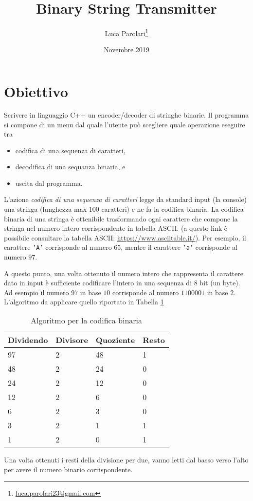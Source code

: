 \documentclass[11pt,a4paper]{article}
\author{
	Luca Parolari\thanks{\href{mailto:luca.parolari23@gmail.com}{luca.parolari23@gmail.com}}}
\title{Binary String Transmitter}
\date{Novembre 2019}
\begin{document}
	
	\maketitle
	
	\section{Obiettivo}
	
	Scrivere in linguaggio C++ un encoder/decoder di stringhe binarie. Il programma si compone di un menu dal quale l'utente può scegliere quale operazione eseguire tra
	\begin{itemize}
		\item codifica di una sequenza di caratteri,
		\item decodifica di una sequanza binaria, e
		\item uscita dal programma.
	\end{itemize}
	
	L'azione \textit{codifica di una sequenza di caratteri} legge da standard input (la console) una stringa (lunghezza max 100 caratteri) e ne fa la codifica binaria. La codifica binaria di una stringa è ottenibile trasformando ogni carattere che compone la stringa nel numero intero corrispondente in tabella ASCII. (a questo link è possibile consultare la tabella ASCII: \href{https://www.asciitable.it/}{https://www.asciitable.it/}). Per esempio, il carattere \texttt{'A'} corrisponde al numero $65$, mentre il carattere \texttt{'a'} corrisponde al numero $97$. 
	
	A questo punto, una volta ottenuto il numero intero che rappresenta il carattere dato in input è sufficiente codificare l'intero in una sequenza di 8 bit (un byte). Ad esempio il numero $97$ in base $10$ corrisponde al numero $1100001$ in base $2$. L'algoritmo da applicare quello riportato in Tabella \ref{table_binary_algo}
	\begin{table}
		\centering
		\begin{tabular}{llll}
			Dividendo & Divisore  & Quoziente & Resto \\
			\hline
			97 & 2 & 48 & 1 \\
			48 & 2 & 24 & 0 \\
			24 & 2 & 12 & 0 \\
			12 & 2 & 6 & 0 \\
			6  & 2 & 3 & 0 \\
			3  & 2 & 1 & 1 \\
			1  & 2 & 0 & 1 \\    
		\end{tabular}
		\label{table_binary_algo}
		\caption{Algoritmo per la codifica binaria}
	\end{table}
	Una volta ottenuti i resti della divisione per due, vanno letti dal basso verso l'alto per avere il numero binario corrispondente.
	
\end{document}
